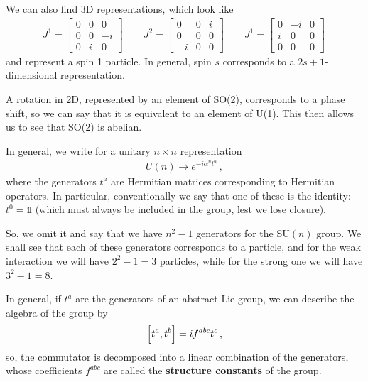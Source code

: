 \documentclass[main.tex]{subfiles}
\begin{document}
We can also find 3D representations, which look like 
%
\begin{subequations}
\begin{align}
J^{1}= \left[\begin{array}{ccc}
0 & 0 & 0 \\ 
0 & 0 & -i \\ 
0 & i & 0
\end{array}\right] 
\qquad 
J^{2}= \left[\begin{array}{ccc}
0 & 0 & i \\ 
0 & 0 & 0 \\ 
-i & 0 & 0
\end{array}\right] 
\qquad 
J^{1}= \left[\begin{array}{ccc}
0 & -i & 0 \\ 
i & 0 & 0 \\ 
0 & 0 & 0
\end{array}\right] 
\,
\end{align}
\end{subequations}
%
and represent a spin 1 particle. In general, spin \(s\) corresponds to a \(2s+1\)-dimensional representation.

A rotation in 2D, represented by an element of SO(2), corresponds to a phase shift, so we can say that it is equivalent to an element of U(1).
This then allows us to see that SO(2) is abelian. 

In general, we write for a unitary \(n \times n\) representation
%
\begin{align}
U(n) \rightarrow e^{-i \alpha^{n} t^{a}}
\,,
\end{align}
%
where the generators \(t^{a}\) are Hermitian matrices corresponding to Hermitian operators. 
In particular, conventionally we say that one of these is the identity: \(t^{0} = \mathbb{1}\) (which must always be included in the group, lest we lose closure).

So, we omit it and say that we have \(n^2-1\) generators for the SU\((n)\) group.
We shall see that each of these generators corresponds to a particle, and for the weak interaction we will have \(2^2-1 = 3\) particles, while for the strong one we will have \(3^2-1=8\). 

In general, if \(t^{a}\) are the generators of an abstract Lie group, we can describe the algebra of the group by 
%
\begin{align}
\qty[t^{a}, t^{b}] = i f^{abc} t^{c}
\,,
\end{align}
%
so, the commutator is decomposed into a linear combination of the generators, whose coefficients \(f^{abc}\) are called the \textbf{structure constants} of the group.
\end{document}
